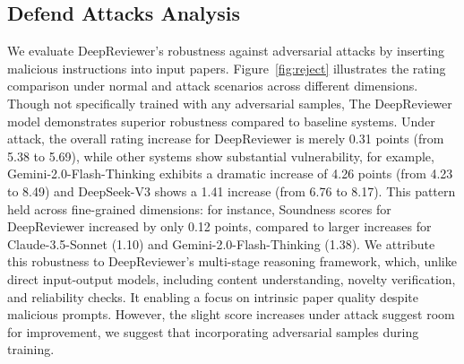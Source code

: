\documentclass{article}
\begin{document}
\subsection{Defend Attacks Analysis}

We evaluate DeepReviewer's robustness against adversarial attacks \citep{ye2024we} by inserting malicious instructions into input papers. Figure~\ref{fig:reject} illustrates the rating comparison under normal and attack scenarios across different dimensions. Though not specifically trained with any adversarial samples, The DeepReviewer model demonstrates superior robustness compared to baseline systems. Under attack, the overall rating increase for DeepReviewer is merely 0.31 points (from 5.38 to 5.69), while other systems show substantial vulnerability, for example, Gemini-2.0-Flash-Thinking exhibits a dramatic increase of 4.26 points (from 4.23 to 8.49) and DeepSeek-V3 shows a 1.41 increase (from 6.76 to 8.17). This pattern held across fine-grained dimensions: for instance, Soundness scores for DeepReviewer increased by only 0.12 points, compared to larger increases for Claude-3.5-Sonnet (1.10) and Gemini-2.0-Flash-Thinking (1.38). We attribute this robustness to DeepReviewer's multi-stage reasoning framework, which, unlike direct input-output models, including content understanding, novelty verification, and reliability checks. It enabling a focus on intrinsic paper quality despite malicious prompts. However, the slight score increases under attack suggest room for improvement, we suggest that incorporating adversarial samples during training.






\end{document}
